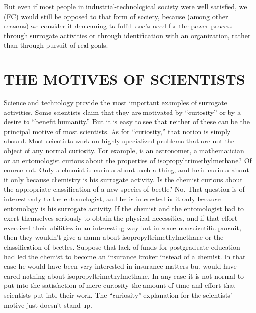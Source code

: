  But even if most people in industrial-technological society were well satisfied, we (FC) would still be opposed to that form of society, because (among other reasons) we consider it demeaning to fulfill one’s need for the power process through surrogate activities or through identification with an organization, rather than through pursuit of real goals.

\chapter{THE MOTIVES OF SCIENTISTS}

 Science and technology provide the most important examples of surrogate activities. Some scientists claim that they are motivated by “curiosity” or by a desire to “benefit humanity.” But it is easy to see that neither of these can be the principal motive of most scientists. As for “curiosity,” that notion is simply absurd. Most scientists work on highly specialized problems that are not the object of any normal curiosity. For example, is an astronomer, a mathematician or an entomologist curious about the properties of isopropyltrimethylmethane? Of course not. Only a chemist is curious about such a thing, and he is curious about it only because chemistry is his surrogate activity. Is the chemist curious about the appropriate classification of a new species of beetle? No. That question is of interest only to the entomologist, and he is interested in it only because entomology is his surrogate activity. If the chemist and the entomologist had to exert themselves seriously to obtain the physical necessities, and if that effort exercised their abilities in an interesting way but in some nonscientific pursuit, then they wouldn’t give a damn about isopropyltrimethylmethane or the classification of beetles. Suppose that lack of funds for postgraduate education had led the chemist to become an insurance broker instead of a chemist. In that case he would have been very interested in insurance matters but would have cared nothing about isopropyltrimethylmethane. In any case it is not normal to put into the satisfaction of mere curiosity the amount of time and effort that scientists put into their work. The “curiosity” explanation for the scientists’ motive just doesn’t stand up.

